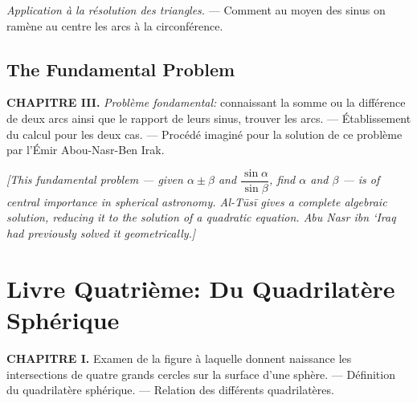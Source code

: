 \documentclass[11pt,a4paper]{article}
\theoremstyle{plain}
\theoremstyle{definition}
\theoremstyle{remark}
\begin{document}
\textit{Application à la résolution des triangles.} --- Comment au moyen des sinus on ramène au centre les arcs à la circonférence.





\subsection{The Fundamental Problem}

\label{sec:fundamental-problem}





\textbf{CHAPITRE III.} \textit{Problème fondamental:} connaissant la somme ou la différence de deux arcs ainsi que le rapport de leurs sinus, trouver les arcs. --- Établissement du calcul pour les deux cas. --- Procédé imaginé pour la solution de ce problème par l'Émir Abou-Nasr-Ben Irak.





\noindent\textit{[This fundamental problem --- given $\alpha \pm \beta$ and $\dfrac{\sin\alpha}{\sin\beta}$, find $\alpha$ and $\beta$ --- is of central importance in spherical astronomy. Al-Tūsī gives a complete algebraic solution, reducing it to the solution of a quadratic equation. Abu Nasr ibn `Iraq had previously solved it geometrically.]}



\clearpage






\section{Livre Quatrième: Du Quadrilatère Sphérique}

\label{sec:livre4}





\textbf{CHAPITRE I.} Examen de la figure à laquelle donnent naissance les intersections de quatre grands cercles sur la surface d'une sphère. --- Définition du quadrilatère sphérique. --- Relation des différents quadrilatères.
\end{document}
